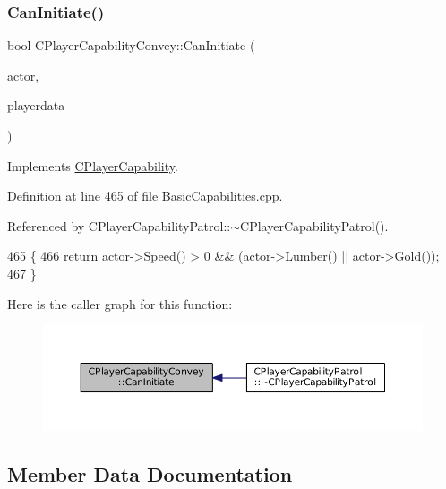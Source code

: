 \subsubsection{\texorpdfstring{Can\+Initiate()}{CanInitiate()}}
{\footnotesize\ttfamily bool C\+Player\+Capability\+Convey\+::\+Can\+Initiate (\begin{DoxyParamCaption}\item[{std\+::shared\+\_\+ptr$<$ \hyperlink{classCPlayerAsset}{C\+Player\+Asset} $>$}]{actor,  }\item[{std\+::shared\+\_\+ptr$<$ \hyperlink{classCPlayerData}{C\+Player\+Data} $>$}]{playerdata }\end{DoxyParamCaption})\hspace{0.3cm}{\ttfamily [virtual]}}



Implements \hyperlink{classCPlayerCapability_aa83b1e1fcaff2985c378132d679154ea}{C\+Player\+Capability}.



Definition at line 465 of file Basic\+Capabilities.\+cpp.



Referenced by C\+Player\+Capability\+Patrol\+::$\sim$\+C\+Player\+Capability\+Patrol().


\begin{DoxyCode}
465                                                                                                            
                \{
466     \textcolor{keywordflow}{return} actor->Speed() > 0 && (actor->Lumber() || actor->Gold());
467 \}
\end{DoxyCode}
Here is the caller graph for this function\+:\nopagebreak
\begin{figure}[H]
\begin{center}
\leavevmode
\includegraphics[width=350pt]{classCPlayerCapabilityConvey_a6c5ebd62a9c3a619c56e070aca5443a7_icgraph}
\end{center}
\end{figure}


\subsection{Member Data Documentation}
\hypertarget{classCPlayerCapabilityConvey_ad04d0065f16c9cbef01832f5a071246d}{}\label{classCPlayerCapabilityConvey_ad04d0065f16c9cbef01832f5a071246d} 
